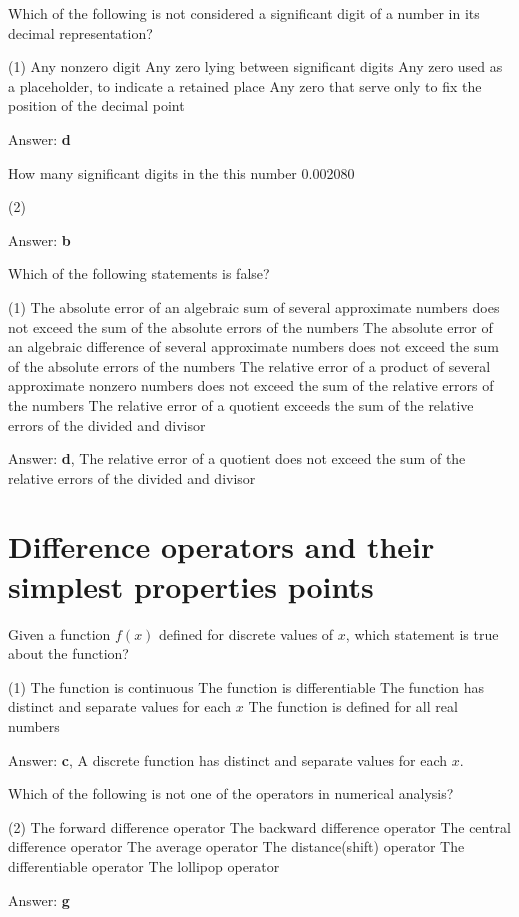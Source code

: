 \documentclass{exam}
\begin{document}
\begin{questions}
	\question Which of the following is not considered a significant digit of a number in its decimal representation?
	\begin{tasks}(1)
		\task Any nonzero digit
		\task Any zero lying between significant digits
		\task Any zero used as a placeholder, to indicate a retained place
		\task Any zero that serve only to fix the position of the decimal point
	\end{tasks}
	Answer: \textbf{d}

	\question How many significant digits in the this number 0.002080
	\begin{tasks}(2)
	\end{tasks}
	Answer: \textbf{b}

	\question Which of the following statements is false?
	\begin{tasks}(1)
		\task The absolute error of an algebraic sum of several approximate numbers does not exceed the sum of the absolute errors of the numbers
		\task The absolute error of an algebraic difference of several approximate numbers does not exceed the sum of the absolute errors of the numbers
		\task The relative error of a product of several approximate nonzero numbers does not exceed the sum of the relative errors of the numbers
		\task The relative error of a quotient exceeds the sum of the relative errors of the divided and divisor
	\end{tasks}
	Answer: \textbf{d}, The relative error of a quotient does not exceed the sum of the relative errors of the divided and divisor

	\section{Difference operators and their simplest properties points}

	\question Given a function $f(x)$ defined for discrete values of $x$, which statement is true about the function?
	\begin{tasks}(1)
		\task The function is continuous
		\task The function is differentiable
		\task The function has distinct and separate values for each $x$
		\task The function is defined for all real numbers
	\end{tasks}
	Answer: \textbf{c}, A discrete function has distinct and separate values for each $x$.

	\question Which of the following is not one of the operators in numerical analysis?
	\begin{tasks}(2)
		\task The forward difference operator
		\task The backward difference operator
		\task The central difference operator
		\task The average operator
		\task The distance(shift) operator
		\task The differentiable operator
		\task The lollipop operator
	\end{tasks}
	Answer: \textbf{g}


\end{questions}
\end{document}

